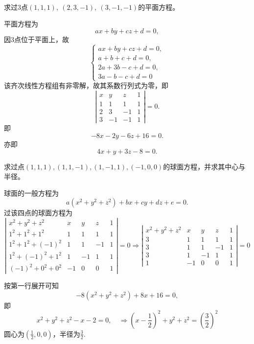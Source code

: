 \begin{frame}
\begin{testexample} 
  求过3点$(1,1,1), ~(2,3,-1), ~(3,-1,-1)$的平面方程。
\end{testexample}

\begin{jie}
平面方程为
$$
ax+by+cz+d=0,
$$
因3点位于平面上，故
$$
\left\{
\begin{array}{r}
ax+by+cz+d=0,\\
a+b+c+d=0, \\
2a+3b-c+d=0, \\
3a-b-c+d=0
\end{array}
\right.
$$
该齐次线性方程组有非零解，故其系数行列式为零，即
$$
\left|
\begin{array}{rrrr}
x&y&z&1\\
1&1&1&1\\
2&3&-1&1\\
3&-1&-1&1
\end{array}
\right|=0.
$$
即
$$
-8 x - 2y -6z +16=0.
$$
亦即
$$
4x+y+3z-8=0.
$$
\end{jie}


\end{frame}

\begin{frame}

\begin{testexample} 
  求过点$(1,1,1), (1,1,-1), (1,-1,1), (-1,0,0)$的球面方程，并求其中心与半径。
\end{testexample}

\begin{jie}
球面的一般方程为
$$
a(x^2+y^2+z^2)+bx+cy+dz+e=0.
$$
过该四点的球面方程为
$$
\left|
\begin{array}{rrrrr}
x^2+y^2+z^2&x&y&z&1\\[0.1cm]
1^2+1^2+1^2&1&1&1&1\\[0.1cm]
1^2+1^2+(-1)^2&1&1&-1&1\\[0.1cm]
1^2+(-1)^2+1^2&1&-1&1&1\\[0.1cm]
(-1)^2+0^2+0^2&-1&0&0&1
\end{array}
\right| = 0 \Rightarrow
\left|
\begin{array}{rrrrr}
x^2+y^2+z^2&x&y&z&1\\[0.1cm]
3&1&1&1&1\\[0.1cm]
3&1&1&-1&1\\[0.1cm]
3&1&-1&1&1\\[0.1cm]
1&-1&0&0&1
\end{array}
\right| = 0
$$

按第一行展开可知
$$
-8(x^2+y^2+z^2) + 8x +16=0,
$$
即
$$
x^2+y^2+z^2-x-2=0, \quad \Rightarrow
(x-\frac12)^2+y^2+z^2=(\frac32)^2
$$
圆心为$(\frac12, 0, 0)$，半径为$\frac32$.
\end{jie}

\end{frame}

